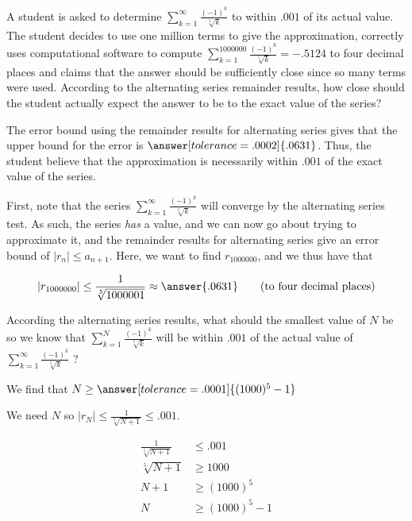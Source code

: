\documentclass{ximera}
\author{Jim Talamo}
\begin{document}
\begin{exercse}
A student is asked to determine $\sum_{k=1}^{\infty} \frac{(-1)^k}{\sqrt[5]{k}}$ to within $.001$ of its actual value.  The student decides to use one million terms to give the approximation, correctly uses computational software to compute $\sum_{k=1}^{1000000} \frac{(-1)^k}{\sqrt[5]{k}} = -.5124$ to four decimal places and claims that the answer should be sufficiently close since so many terms were used.  According to the alternating series remainder results, how close should the student actually expect the answer to be to the exact value of the series? 

The error bound using the remainder results for alternating series gives that the upper bound for the error is $\answer[tolerance=.0002]{.0631}$.  Thus, the student  believe that the approximation is necessarily within $.001$ of the exact value of the series.


\begin{hint}
First, note that the series $\sum_{k=1}^{\infty} \frac{(-1)^k}{\sqrt[5]{k}}$ will converge by the alternating series test.  As such, the series \emph{has} a value, and we can now go about trying to approximate it, and the remainder results for alternating series give an error bound of $|r_n| \leq a_{n+1}$.  Here, we want to find $r_{1000000}$, and we thus have that 

\[
|r_{1000000}| \leq \frac{1}{\sqrt[5]{1000001}} \approx \answer{.0631} \qquad \textrm{(to four decimal places)}
\] 

\end{hint}

\begin{exercise}
According the alternating series results, what should the smallest value of $N$ be so we know that $\sum_{k=1}^N \frac{(-1)^k}{\sqrt[5]{k}}$  will be within $.001$ of the actual value of $\sum_{k=1}^{\infty} \frac{(-1)^k}{\sqrt[5]{k}}$ ?

We find that $N \geq \answer[tolerance=.0001]{(1000)^5-1} $

\begin{hint}
We need $N$ so $|r_N| \leq \frac{1}{\sqrt[5]{N+1}} \leq .001$.

\begin{align*}
\frac{1}{\sqrt[5]{N+1}} &\leq .001 \\
\sqrt[5]{N+1} &\geq 1000 \\
N+1 &\geq (1000)^5 \\
N &\geq (1000)^5 -1\\
\end{align*}


\end{hint}
\end{exercise}
\end{exercse}
\end{document}
